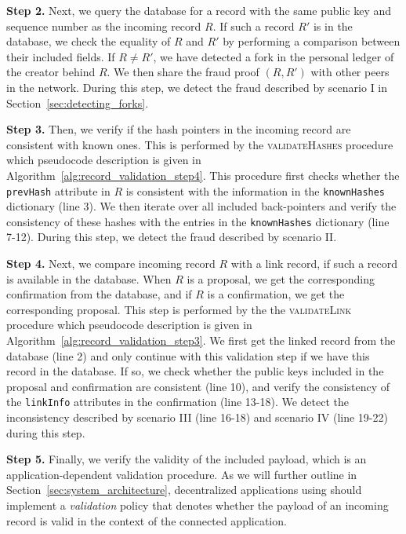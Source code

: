 \textbf{Step 2.}
Next, we query the database for a record with the same public key and sequence number as the incoming record $ R $.
If such a record $ R' $ is in the database, we check the equality of $ R $ and $ R' $ by performing a comparison between their included fields.
If $ R \not= R' $, we have detected a fork in the personal ledger of the creator behind $ R $.
We then share the fraud proof $ (R, R') $ with other peers in the network.
During this step, we detect the fraud described by scenario I in Section~\ref{sec:detecting_forks}.

\textbf{Step 3.}
Then, we verify if the hash pointers in the incoming record are consistent with known ones.
This is performed by the \textsc{validateHashes} procedure which pseudocode description is given in Algorithm~\ref{alg:record_validation_step4}.
This procedure first checks whether the \texttt{prevHash} attribute in $ R $ is consistent with the information in the \texttt{knownHashes} dictionary (line 3).
We then iterate over all included back-pointers and verify the consistency of these hashes with the entries in the \texttt{knownHashes} dictionary (line 7-12).
During this step, we detect the fraud described by scenario II.

\textbf{Step 4.}
Next, we compare incoming record $ R $ with a link record, if such a record is available in the database.
When $ R $ is a proposal, we get the corresponding confirmation from the database, and if $ R $ is a confirmation, we get the corresponding proposal.
This step is performed by the the \textsc{validateLink} procedure which pseudocode description is given in Algorithm~\ref{alg:record_validation_step3}.
We first get the linked record from the database (line 2) and only continue with this validation step if we have this record in the database.
If so, we check whether the public keys included in the proposal and confirmation are consistent (line 10), and verify the consistency of the \texttt{linkInfo} attributes in the confirmation (line 13-18).
We detect the inconsistency described by scenario III (line 16-18) and scenario IV (line 19-22) during this step.

\textbf{Step 5.}
Finally, we verify the validity of the included payload, which is an application-dependent validation procedure.
As we will further outline in Section~\ref{sec:system_architecture}, decentralized applications using \TrustChain{} should implement a \emph{validation} policy that denotes whether the payload of an incoming record is valid in the context of the connected application.

